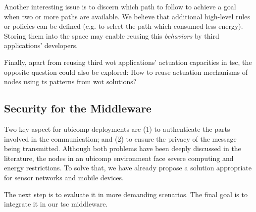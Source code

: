 % 
Another interesting issue is to discern which path to follow to achieve a goal when two or more paths are available.
We believe that additional high-level rules or policies can be defined (e.g. to select the path which consumed less energy).
Storing them into the space may enable reusing this \emph{behaviors} by third applications' developers.

Finally, apart from reusing third \ac{wot} applications' actuation capacities in \ac{tsc}, the opposite question could also be explored:
How to reuse actuation mechanisms of nodes using \ac{ts} patterns from \ac{wot} solutions?


\subsection{Security for the Middleware}

Two key aspect for \ac{ubicomp} deployments are
(1) to authenticate the parts involved in the communication; and
(2) to ensure the privacy of the message being transmitted.
Although both problems have been deeply discussed in the literature,
the nodes in an \ac{ubicomp} environment face severe computing and energy restrictions.
To solve that, we have already propose a solution appropriate for sensor networks and mobile devices.

The next step is to evaluate it in more demanding scenarios.
The final goal is to integrate it in our \ac{tsc} middleware.


